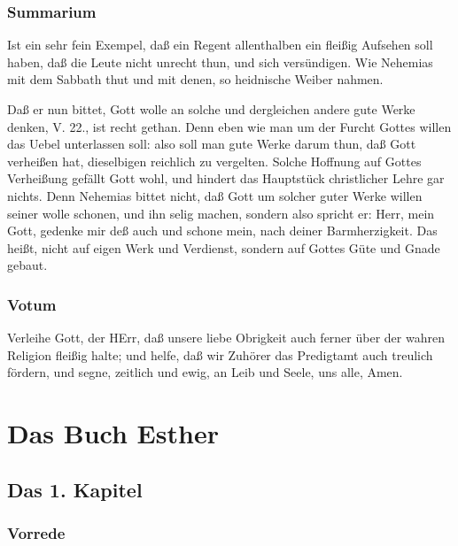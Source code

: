 
\section{Summarium}

Ist ein sehr fein Exempel, daß ein Regent allenthalben ein fleißig Aufsehen soll haben, daß die Leute nicht unrecht thun, und sich versündigen. Wie Nehemias mit dem Sabbath thut und mit denen, so heidnische Weiber nahmen.

Daß er nun bittet, Gott wolle an solche und dergleichen andere gute Werke denken, V. 22., ist recht gethan. Denn eben wie man um der Furcht Gottes willen das Uebel unterlassen soll: also soll man gute Werke darum thun, daß Gott verheißen hat, dieselbigen reichlich zu vergelten. Solche Hoffnung auf Gottes Verheißung gefällt Gott wohl, und hindert das Hauptstück christlicher Lehre gar nichts. Denn Nehemias bittet nicht, daß Gott um solcher guter Werke willen seiner wolle schonen, und ihn selig machen, sondern also spricht er: Herr, mein Gott, gedenke mir deß auch und schone mein, nach deiner Barmherzigkeit. Das heißt, nicht auf eigen Werk und Verdienst, sondern auf Gottes Güte und Gnade gebaut.

\section{Votum}

Verleihe Gott, der HErr, daß unsere liebe Obrigkeit auch ferner über der wahren Religion fleißig halte; und helfe, daß wir Zuhörer das Predigtamt auch treulich fördern, und segne, zeitlich und ewig, an Leib und Seele, uns alle, Amen.

\part{Das Buch Esther}

\chapter{Das 1. Kapitel}

\section{Vorrede}

